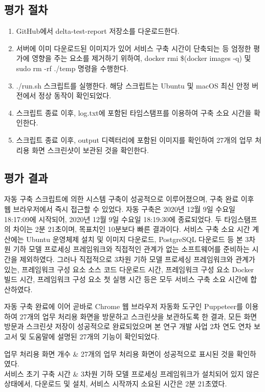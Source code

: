\documentclass[11pt,oneside,openany,itemph,a4paper,chapter]{oblivoir}
\newenvironment{tablekeyvalue}[2]
{\bgroup
\table[H] \tabularx{\linewidth}{|
>{\setlength{\baselineskip}{1.2\baselineskip}}P{#1\linewidth}|
>{\setlength{\baselineskip}{1.2\baselineskip}}P{#2\linewidth}|}
\hline}
{\endtabularx \endtable \egroup}
\begin{document}
\subsection{평가 절차}
\begin{enumerate}
    \item GitHub에서 delta-test-report 저장소를 다운로드한다.
    \item 서버에 이미 다운로드된 이미지가 있어 서비스 구축 시간이 단축되는 등 엄정한 평가에 영향을 주는 요소를 제거하기 위하여, docker rmi \$(docker images -q) 및 sudo rm -rf ./temp 명령을 수행한다.
    \item ./run.sh 스크립트를 실행한다. 해당 스크립트는 Ubuntu 및 macOS 최신 안정 버전에서 정상 동작이 확인되었다.
    \item 스크립트 종료 이후, log.txt에 포함된 타임스탬프를 이용하여 구축 소요 시간을 확인한다.
    \item 스크립트 종료 이후, output 디렉터리에 포함된 이미지를 확인하여 27개의 업무 처리용 화면 스크린샷이 보관된 것을 확인한다.
\end{enumerate}

\subsection{평가 결과}
자동 구축 스크립트에 의한 시스템 구축이 성공적으로 이루어졌으며, 구축 완료 이후 웹 브라우저에서 즉시 접근할 수 있었다. 자동 구축은 2020년 12월 9일 수요일 18:17:09에 시작되어, 2020년 12월 9일 수요일 18:19:30에 종료되었다. 두 타임스탬프의 차이는 2분 21초이며, 목표치인 10분보다 빠른 결과이다. 서비스 구축 소요 시간 계산에는 Ubuntu 운영체제 설치 및 이미지 다운로드, PostgreSQL 다운로드 등 본 3차원 기하 모델 프로세싱 프레임워크와 직접적인 관계가 없는 소프트웨어를 준비하는 시간을 제외하였다. 그러나 직접적으로 3차원 기하 모델 프로세싱 프레임워크와 관계가 있는, 프레임워크 구성 요소 소스 코드 다운로드 시간, 프레임워크 구성 요소 Docker 빌드 시간, 프레임워크 구성 요소 첫 실행 시간 등은 모두 서비스 구축 소요 시간에 합산하였다.

자동 구축 완료에 이어 곧바로 Chrome 웹 브라우저 자동화 도구인 Puppeteer를 이용하여 27개의 업무 처리용 화면을 방문하고 스크린샷을 보관하도록 한 결과, 모든 화면 방문과 스크린샷 저장이 성공적으로 완료되었으며 본 연구 개발 사업 2차 연도 연차 보고서 및 도움말에 설명된 27개의 기능이 확인되었다.

\begin{tablekeyvalue}{0.3}{0.7}
    업무 처리용 화면 개수 & 27개의 업무 처리용 화면이 성공적으로 표시된 것을 확인하였다. \\ \hline
    서비스 초기 구축 시간 & 3차원 기하 모델 프로세싱 프레임워크가 설치되어 있지 않은 상태에서, 다운로드 및 설치, 서비스 시작까지 소요된 시간은 2분 21초였다. \\ \hline
\end{tablekeyvalue}
\end{document}
